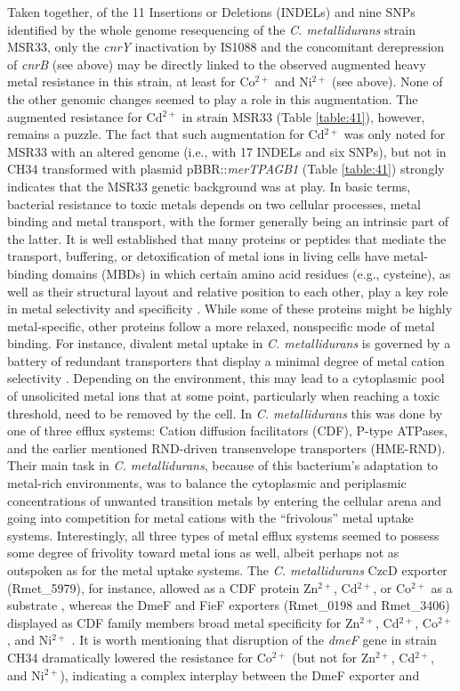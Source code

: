 Taken together, of the 11 Insertions or Deletions (INDELs) and nine SNPs identified by the whole genome resequencing of the \textit{C. metallidurans} strain MSR33, only the \textit{cnrY} inactivation by IS1088 and the concomitant derepression of \textit{cnrB} (see above) may be directly linked to the observed augmented heavy metal resistance in this strain, at least for Co$^{2+}$ and Ni$^{2+}$ (see above). None of the other genomic changes seemed to play a role in this augmentation. The augmented resistance for Cd$^{2+}$ in strain MSR33 (Table \ref{table:41}), however, remains a puzzle. The fact that such augmentation for Cd$^{2+}$ was only noted for MSR33 with an altered genome (i.e., with 17 INDELs and six SNPs), but not in CH34 transformed with plasmid pBBR::\textit{merTPAGB1} (Table \ref{table:41}) strongly indicates that the MSR33 genetic background was at play. In basic terms, bacterial resistance to toxic metals depends on two cellular processes, metal binding and metal transport, with the former generally being an intrinsic part of the latter. It is well established that many proteins or peptides that mediate the transport, buffering, or detoxification of metal ions in living cells have metal-binding domains (MBDs) in which certain amino acid residues (e.g., cysteine), as well as their structural layout and relative position to each other, play a key role in metal selectivity and specificity \citep{zheng2008data, thilakaraj2007silico}. While some of these proteins might be highly metal-specific, other proteins follow a more relaxed, nonspecific mode of metal binding. For instance, divalent metal uptake in \textit{C. metallidurans} is governed by a battery of redundant transporters that display a minimal degree of metal cation selectivity \citep{kirsten2011contributions}. Depending on the environment, this may lead to a cytoplasmic pool of unsolicited metal ions that at some point, particularly when reaching a toxic threshold, need to be removed by the cell. In \textit{C. metallidurans} this was done by one of three efflux systems: Cation diffusion facilitators (CDF), P-type ATPases, and the earlier mentioned RND-driven transenvelope transporters (HME-RND). Their main task in \textit{C. metallidurans}, because of this bacterium’s adaptation to metal-rich environments, was to balance the cytoplasmic and periplasmic concentrations of unwanted transition metals by entering the cellular arena and going into competition for metal cations with the “frivolous” metal uptake systems. Interestingly, all three types of metal efflux systems seemed to possess some degree of frivolity toward metal ions as well, albeit perhaps not as outspoken as for the metal uptake systems. The \textit{C. metallidurans} CzcD exporter (Rmet\_5979), for instance, allowed as a CDF protein Zn$^{2+}$, Cd$^{2+}$, or Co$^{2+}$ as a substrate \citep{anton1999czcd}, whereas the DmeF and FieF exporters (Rmet\_0198 and Rmet\_3406) displayed as CDF family members broad metal specificity for Zn$^{2+}$, Cd$^{2+}$, Co$^{2+}$, and Ni$^{2+}$ \citep{munkelt2004chromosomally}. It is worth mentioning that disruption of the \textit{dmeF} gene in strain CH34 dramatically lowered the resistance for Co$^{2+}$ (but not for Zn$^{2+}$, Cd$^{2+}$, and Ni$^{2+}$), indicating a complex interplay between the DmeF exporter and 